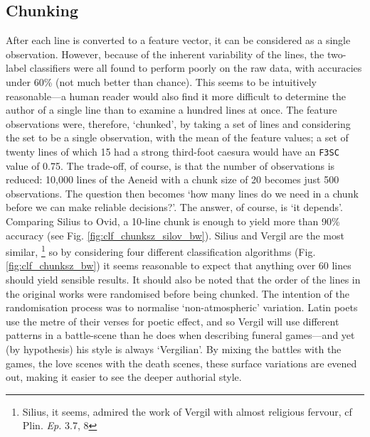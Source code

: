 \documentclass[11pt,a4paper]{scrartcl} %
\begin{document}
{\subsection{Chunking}

After each line is converted to a feature vector, it can be considered as a single observation. However, because of the inherent variability of the lines, the two-label classifiers were all found to perform poorly on the raw data, with accuracies under 60\% (not much better than chance). This seems to be intuitively reasonable---a human reader would also find it more difficult to determine the author of a single line than to examine a hundred lines at once. The feature observations were, therefore, `chunked', by taking a set of lines and considering the set to be a single observation, with the mean of the feature values; a set of twenty lines of which 15 had a strong third-foot caesura would have an \texttt{F3SC} value of 0.75. The trade-off, of course, is that the number of observations is reduced: 10,000 lines of the Aeneid with a chunk size of 20 becomes just 500 observations. The question then becomes `how many lines do we need in a chunk before we can make reliable decisions?'. The answer, of course, is `it depends'. Comparing Silius to Ovid, a 10-line chunk is enough to yield more than 90\% accuracy (see Fig. \ref{fig:clf_chunksz_silov_bw}). Silius and Vergil are the most similar,%
\footnote{Silius, it seems, admired the work of Vergil with almost religious fervour, cf Plin. \textit{Ep.} 3.7, 8}
so by considering four different classification algorithms (Fig. \ref{fig:clf_chunksz_bw}) it seems reasonable to expect that anything over 60 lines should yield sensible results. It should also be noted that the order of the lines in the original works were randomised before being chunked. The intention of the randomisation process was to normalise `non-atmospheric' variation. Latin poets use the metre of their verses for poetic effect, and so Vergil will use different patterns in a battle-scene than he does when describing funeral games---and yet (by hypothesis) his style is always `Vergilian'. By mixing the battles with the games, the love scenes with the death scenes, these surface variations are evened out, making it easier to see the deeper authorial style.

}
\end{document}
